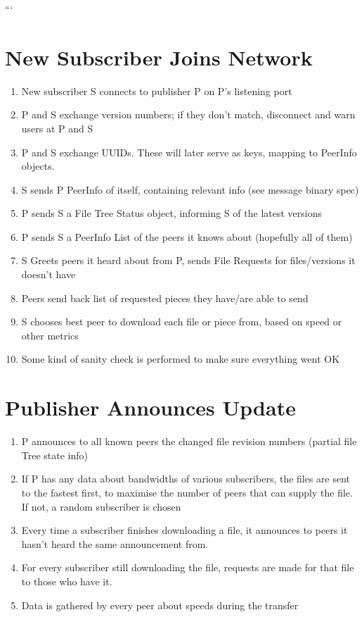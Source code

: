 \documentclass[12pt,a4paper,]{adreport}
\begin{document}
```

\section{New Subscriber Joins
Network}\label{new-subscriber-joins-network}

\begin{enumerate}
\def\labelenumi{\arabic{enumi}.}
\itemsep1pt\parskip0pt
\item
  New subscriber S connects to publisher P on P's listening port
\item
  P and S exchange version numbers; if they don't match, disconnect and
  warn users at P and S
\item
  P and S exchange UUIDs. These will later serve as keys, mapping to
  PeerInfo objects.
\item
  S sends P PeerInfo of itself, containing relevant info (see message
  binary spec)
\item
  P sends S a File Tree Status object, informing S of the latest
  versions
\item
  P sends S a PeerInfo List of the peers it knows about (hopefully all
  of them)
\item
  S Greets peers it heard about from P, sends File Requests for
  files/versions it doesn't have
\item
  Peers send back list of requested pieces they have/are able to send
\item
  S chooses best peer to download each file or piece from, based on
  speed or other metrics
\item
  Some kind of sanity check is performed to make sure everything went OK
\end{enumerate}

\section{Publisher Announces Update}\label{publisher-announces-update}

\begin{enumerate}
\def\labelenumi{\arabic{enumi}.}
\itemsep1pt\parskip0pt
\item
  P announces to all known peers the changed file revision numbers
  (partial file Tree state info)
\item
  If P has any data about bandwidths of various subscribers, the files
  are sent to the fastest first, to maximise the number of peers that
  can supply the file. If not, a random subscriber is chosen
\item
  Every time a subscriber finishes downloading a file, it announces to
  peers it hasn't heard the same announcement from.
\item
  For every subscriber still downloading the file, requests are made for
  that file to those who have it.
\item
  Data is gathered by every peer about speeds during the transfer
\end{enumerate}
\end{document}

